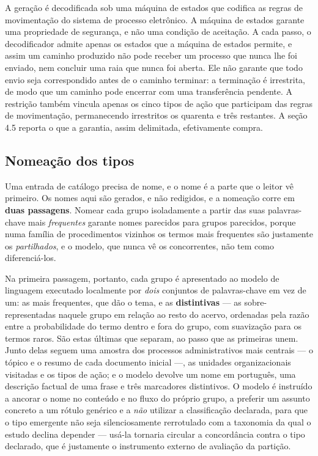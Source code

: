 A geração é decodificada sob uma máquina de estados que codifica as regras de movimentação do sistema de
processo eletrônico. A máquina de estados garante uma propriedade de segurança, e não uma condição de aceitação. A cada passo,
o decodificador admite apenas os estados que a máquina de estados permite, e assim um caminho produzido
não pode receber um processo que nunca lhe foi enviado, nem concluir uma raia que nunca foi aberta.
Ele não garante que todo envio seja correspondido antes de o caminho terminar: a terminação é
irrestrita, de modo que um caminho pode encerrar com uma transferência pendente. A restrição também
vincula apenas os cinco tipos de ação que participam das regras de movimentação, permanecendo
irrestritos os quarenta e três restantes. A seção 4.5 reporta o que a garantia, assim delimitada,
efetivamente compra.

\subsection{Nomeação dos tipos}\label{sec:nomeacao}

Uma entrada de catálogo precisa de nome, e o nome é a parte que o leitor vê primeiro. Os nomes aqui
são gerados, e não redigidos, e a nomeação corre em \textbf{duas passagens}. Nomear cada grupo
isoladamente a partir das suas
palavras-chave mais \emph{frequentes} garante nomes parecidos para grupos parecidos, porque numa
família de procedimentos vizinhos os termos mais frequentes são justamente os \emph{partilhados},
e o modelo, que nunca vê os concorrentes, não tem como diferenciá-los.

Na primeira passagem, portanto, cada grupo é apresentado ao modelo de linguagem executado
localmente por \emph{dois} conjuntos de palavras-chave em vez de um: as mais frequentes, que dão o
tema, e as \textbf{distintivas} --- as sobre-representadas naquele grupo em relação ao resto do
acervo, ordenadas pela razão entre a probabilidade do termo dentro e fora do grupo, com suavização
para os termos raros. São estas últimas que separam, ao passo que as primeiras unem. Junto delas
seguem uma amostra dos processos administrativos mais centrais --- o tópico e o resumo de cada
documento inicial ---, as unidades organizacionais visitadas e os tipos de ação; e o modelo devolve
um nome em português, uma descrição factual de uma frase e três marcadores
distintivos. O modelo é instruído a ancorar o nome no conteúdo e no fluxo do próprio grupo, a
preferir um assunto concreto a um rótulo genérico e a \emph{não} utilizar a classificação
declarada, para que o tipo emergente não seja silenciosamente rerrotulado com a taxonomia da qual o
estudo declina depender --- usá-la tornaria circular a concordância contra o tipo declarado, que é
justamente o instrumento externo de avaliação da partição.


